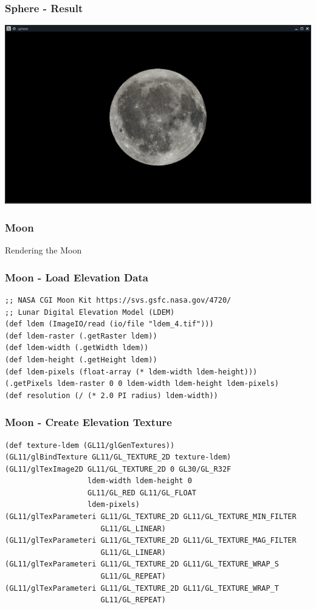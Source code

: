 \documentclass[aspectratio=169,11pt,xcolor=dvipsnames]{beamer}
\begin{document}
\begin{frame}
  \frametitle{Sphere {-} Result}
  \begin{center}
    \includegraphics[width=.8\textwidth]{sphere}
  \end{center}
\end{frame}

\begin{frame}
  \frametitle{Moon}
  \begin{center}
    \begin{huge}
      Rendering the Moon
    \end{huge}
  \end{center}
\end{frame}

\begin{frame}[fragile]
  \frametitle{Moon {-} Load Elevation Data}
  \begin{verbatim}
;; NASA CGI Moon Kit https://svs.gsfc.nasa.gov/4720/
;; Lunar Digital Elevation Model (LDEM)
(def ldem (ImageIO/read (io/file "ldem_4.tif")))
(def ldem-raster (.getRaster ldem))
(def ldem-width (.getWidth ldem))
(def ldem-height (.getHeight ldem))
(def ldem-pixels (float-array (* ldem-width ldem-height)))
(.getPixels ldem-raster 0 0 ldem-width ldem-height ldem-pixels)
(def resolution (/ (* 2.0 PI radius) ldem-width))
  \end{verbatim}
\end{frame}

\begin{frame}[fragile]
  \frametitle{Moon {-} Create Elevation Texture}
  \begin{verbatim}
(def texture-ldem (GL11/glGenTextures))
(GL11/glBindTexture GL11/GL_TEXTURE_2D texture-ldem)
(GL11/glTexImage2D GL11/GL_TEXTURE_2D 0 GL30/GL_R32F
                   ldem-width ldem-height 0
                   GL11/GL_RED GL11/GL_FLOAT
                   ldem-pixels)
(GL11/glTexParameteri GL11/GL_TEXTURE_2D GL11/GL_TEXTURE_MIN_FILTER
                      GL11/GL_LINEAR)
(GL11/glTexParameteri GL11/GL_TEXTURE_2D GL11/GL_TEXTURE_MAG_FILTER
                      GL11/GL_LINEAR)
(GL11/glTexParameteri GL11/GL_TEXTURE_2D GL11/GL_TEXTURE_WRAP_S
                      GL11/GL_REPEAT)
(GL11/glTexParameteri GL11/GL_TEXTURE_2D GL11/GL_TEXTURE_WRAP_T
                      GL11/GL_REPEAT)
  \end{verbatim}
\end{frame}
\end{document}

